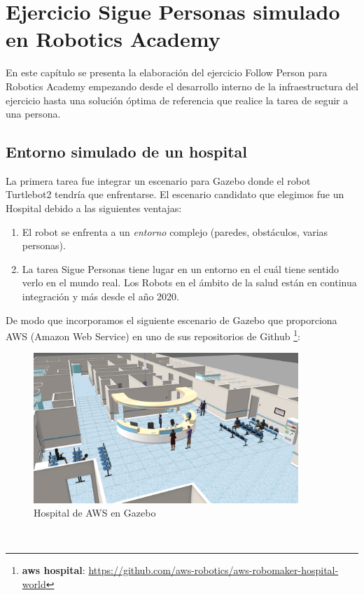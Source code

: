 \chapter{Ejercicio Sigue Personas simulado en Robotics Academy}
\label{cap:capitulo5}

En este capítulo se presenta la elaboración del ejercicio Follow Person para Robotics Academy empezando desde el desarrollo interno de la infraestructura del ejercicio hasta una solución óptima de referencia que realice la tarea de seguir a una persona.



\section{Entorno simulado de un hospital}
\label{sec:hospital_gazebo}

La primera tarea fue integrar un escenario para Gazebo donde el robot Turtlebot2 tendría que enfrentarse. El escenario candidato que elegimos fue un Hospital debido a las siguientes ventajas:

\begin{enumerate}
	\item El robot se enfrenta a un \textit{entorno} complejo (paredes, obstáculos, varias personas).
	\item La tarea Sigue Personas tiene lugar en un entorno en el cuál tiene sentido verlo en el mundo real. Los Robots en el ámbito de la salud están en continua integración y más desde el año 2020.
\end{enumerate}

De modo que incorporamos el siguiente escenario de Gazebo que proporciona AWS (Amazon Web Service) en uno de sus repositorios de Github \footnote{\textbf{aws hospital}: \url{https://github.com/aws-robotics/aws-robomaker-hospital-world}}:\\

\begin{figure} [H]
  \begin{center}
    \includegraphics[width=10cm]{imagenes/hospital_world.png}
  \end{center}
  \caption[Hospital de AWS en Gazebo]{Hospital de AWS en Gazebo}
  \label{fig:hospital_gazebo}
\end{figure}\

